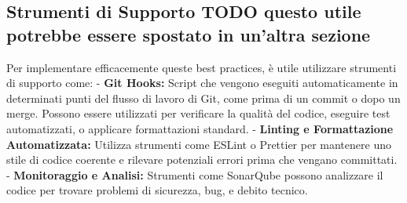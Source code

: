 


\subsection{Strumenti di Supporto TODO questo utile potrebbe essere spostato in un'altra sezione}

Per implementare efficacemente queste best practices, è utile utilizzare strumenti di supporto come:
- \textbf{Git Hooks:} Script che vengono eseguiti automaticamente in determinati punti del flusso di lavoro di Git, come prima di un commit o dopo un merge. Possono essere utilizzati per verificare la qualità del codice, eseguire test automatizzati, o applicare formattazioni standard.
- \textbf{Linting e Formattazione Automatizzata:} Utilizza strumenti come ESLint o Prettier per mantenere uno stile di codice coerente e rilevare potenziali errori prima che vengano committati.
- \textbf{Monitoraggio e Analisi:} Strumenti come SonarQube possono analizzare il codice per trovare problemi di sicurezza, bug, e debito tecnico.

